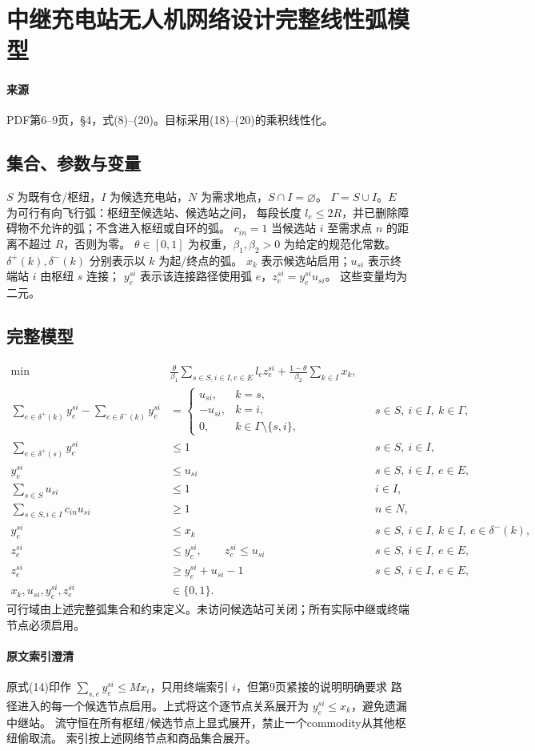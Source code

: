 \documentclass[UTF8,11pt]{ctexart}
\begin{document}
\section*{中继充电站无人机网络设计完整线性弧模型}

\paragraph{来源} PDF第6--9页，§4，式(8)--(20)。目标采用(18)--(20)的乘积线性化。
\subsection*{集合、参数与变量}
$S$ 为既有仓/枢纽，$I$ 为候选充电站，$N$ 为需求地点，$S\cap I=\varnothing$。
$\Gamma=S\cup I$。$E$ 为可行有向飞行弧：枢纽至候选站、候选站之间，
每段长度 $l_e\le2R$，并已删除障碍物不允许的弧；不含进入枢纽或自环的弧。
$c_{in}=1$ 当候选站 $i$ 至需求点 $n$ 的距离不超过 $R$，否则为零。
$\theta\in[0,1]$ 为权重，$\beta_1,\beta_2>0$ 为给定的规范化常数。
$\delta^+(k),\delta^-(k)$ 分别表示以 $k$ 为起/终点的弧。
$x_k$ 表示候选站启用；$u_{si}$ 表示终端站 $i$ 由枢纽 $s$ 连接；
$y_e^{si}$ 表示该连接路径使用弧 $e$，$z_e^{si}=y_e^{si}u_{si}$。
这些变量均为二元。
\subsection*{完整模型}
\begin{align}
\min\quad&
\frac{\theta}{\beta_1}\sum_{s\in S,i\in I,e\in E}l_e z_e^{si}
+\frac{1-\theta}{\beta_2}\sum_{k\in I}x_k,\\
\sum_{e\in\delta^+(k)}y_e^{si}-\sum_{e\in\delta^-(k)}y_e^{si}
&=\begin{cases}u_{si},&k=s,\\-u_{si},&k=i,\\0,&k\in\Gamma\setminus\{s,i\},\end{cases}
&&s\in S,\ i\in I,\ k\in\Gamma,\\
\sum_{e\in\delta^+(s)}y_e^{si}&\le1 &&s\in S,\ i\in I,\\
y_e^{si}&\le u_{si} &&s\in S,\ i\in I,\ e\in E,\\
\sum_{s\in S}u_{si}&\le1 &&i\in I,\\
\sum_{s\in S,i\in I}c_{in}u_{si}&\ge1 &&n\in N,\\
y_e^{si}&\le x_k &&s\in S,\ i\in I,\ k\in I,\ e\in\delta^-(k),\\
z_e^{si}&\le y_e^{si},\qquad z_e^{si}\le u_{si}
&&s\in S,\ i\in I,\ e\in E,\\
z_e^{si}&\ge y_e^{si}+u_{si}-1 &&s\in S,\ i\in I,\ e\in E,\\
x_k,u_{si},y_e^{si},z_e^{si}&\in\{0,1\}. &&
\end{align}
可行域由上述完整弧集合和约束定义。未访问候选站可关闭；所有实际中继或终端节点必须启用。
\paragraph{原文索引澄清}
原式(14)印作 $\sum_{s,e}y_e^{si}\le Mx_i$，只用终端索引 $i$，但第9页紧接的说明明确要求
路径进入的每一个候选节点启用。上式将这个逐节点关系展开为 $y_e^{si}\le x_k$，避免遗漏中继站。
流守恒在所有枢纽/候选节点上显式展开，禁止一个commodity从其他枢纽偷取流。
索引按上述网络节点和商品集合展开。
\end{document}
